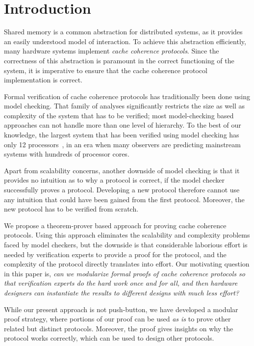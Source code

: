 \section{Introduction}
\label{sec:Introduction}

Shared memory is a common abstraction for distributed systems, as it provides
an easily understood model of interaction. To achieve this abstraction
efficiently, many hardware systems implement \emph{cache coherence protocols}.
Since the correctness of this abstraction is paramount in the correct
functioning of the system, it is imperative to ensure that the cache coherence
protocol implementation is correct.

Formal verification of cache coherence protocols has traditionally been done
using model checking. That family of analyses significantly restricts the size
as well as complexity of the system that has to be verified; most model-checking
based approaches can not handle more than one level of hierarchy. To the best of
our knowledge, the largest system that has been verified using model checking
has only 12 processors~\cite{Chen:2008:VHC:1559300}, in an era when many
observers are predicting mainstream systems with hundreds of processor cores.

Apart from scalability concerns, another downside of model checking
is that it provides no intuition as to why a protocol is correct, if
the model checker successfully proves a protocol. Developing a new protocol
therefore cannot use any intuition that could have been gained from
the first protocol. Moreover, the new protocol has to be verified from scratch.

We propose a theorem-prover based approach for proving cache coherence
protocols. Using this approach eliminates the scalability and complexity
problems faced by model checkers, but the downside is that considerable
laborious effort is needed by verification experts to provide a proof for the
protocol, and the complexity of the protocol directly translates into effort.
Our motivating question in this paper is,
\emph{can we modularize formal proofs of cache coherence protocols so that
verification experts do the hard work once and for all, and then hardware
designers can instantiate the results to different designs with much less
effort?}

While our present approach is not push-button, we have developed a
modular proof strategy, where portions of our proof can be used \emph{as is} to
prove other related but distinct protocols. Moreover, the proof gives
insights on why the protocol works correctly, which can be used to design other
protocols.

